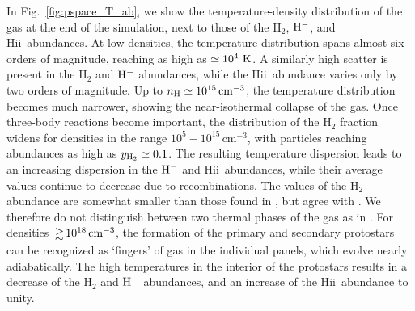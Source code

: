 \documentclass[useAMS,usenatbib]{mnras}
\newcommand{\cmmm}{\text{cm}^{-3}}
\newcommand{\HH}{\text{H}_2}          %
\newcommand{\HM}{{\rm H}^{-}}     %
\newcommand{\HII}{H{\sc ii}~}    %
\newcommand{\nh}{n_{\rm H}}
\begin{document}
In Fig.~\ref{fig:pspace_T_ab}, we show the temperature-density distribution of the gas at the end of the simulation, next to those of the $\HH$, $\HM$, and \HII abundances. At low densities, the temperature distribution spans almost six orders of magnitude, reaching as high as $\simeq 10^4~{\rm K}$. A similarly high scatter is present in the $\HH$ and $\HM$ abundances, while the \HII abundance varies only by two orders of magnitude. Up to $\nh\simeq 10^{15}\,\cmmm$, the temperature distribution becomes much narrower, showing the near-isothermal collapse of the gas. Once three-body reactions become important, the distribution of the $\HH$ fraction widens for densities in the range $10^5 - 10^{15}\,\cmmm$, with particles reaching abundances as high as $y_{\rm H_2}\simeq 0.1$. The resulting temperature dispersion leads to an increasing dispersion in the $\HM$ and \HII abundances, while their average values continue to decrease due to recombinations. The values of the $\HH$ abundance are somewhat smaller than those found in \citet{Inayoshi_2014}, but agree with \citet{Latif_2013a}. We therefore do not distinguish between two thermal phases of the gas as in \citet{Inayoshi_2014}. For densities $\ga 10^{18}\,\cmmm$, the formation of the primary and secondary protostars can be recognized as `fingers' of gas in the individual panels, which evolve nearly adiabatically. The high temperatures in the interior of the protostars results in a decrease of the $\HH$ and $\HM$ abundances, and an increase of the \HII abundance to unity.
\end{document}

